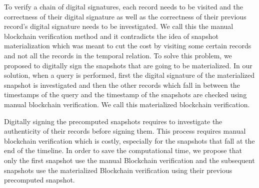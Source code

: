 		To verify a chain of digital signatures, each record needs to be visited and the correctness of their digital signature as well as the correctness of their previous record's digital signature needs to be investigated. We call this the manual blockchain verification method and it contradicts the idea of snapshot materialization which was meant to cut the cost by visiting some certain records and not all the records in the temporal relation. To solve this problem, we proposed to digitally sign the snapshots that are going to be materialized. In our solution, when a query is performed, first the digital signature of the materialized snapshot is investigated and then the other records which fall in between the timestamps of the query and the timestamp of the snapshots are checked using manual blockchain verification. We call this materialized blockchain verification.
		
		Digitally signing the precomputed snapshots requires to investigate the authenticity of their records before signing them. This process requires manual blockchain verification which is costly, especially for the snapshots that fall at the end of the timeline. In order to save the computational time, we propose that only the first snapshot use the manual Blockchain verification and the subsequent snapshots use the materialized Blockchain verification using their previous precomputed snapshot. 

